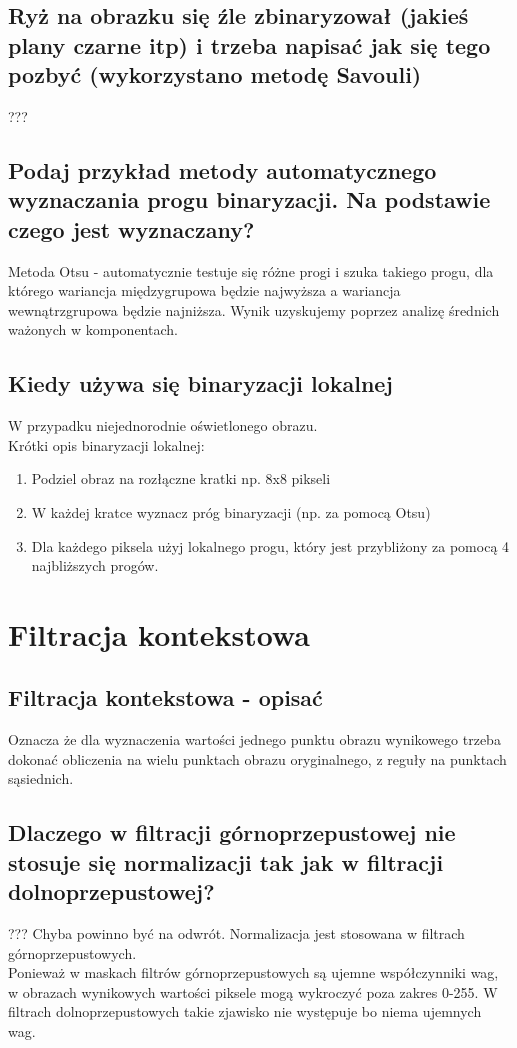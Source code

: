 \documentclass[a4paper, 12pt, titlepage]{article}
\begin{document}
\subsection{Ryż na obrazku się źle zbinaryzował (jakieś plany czarne itp) i trzeba napisać jak się tego pozbyć (wykorzystano metodę Savouli)}
???

\subsection{Podaj przykład metody automatycznego wyznaczania progu binaryzacji. Na podstawie czego jest wyznaczany?}
Metoda Otsu - automatycznie testuje się różne progi i szuka takiego progu, dla którego wariancja międzygrupowa będzie najwyższa a wariancja wewnątrzgrupowa będzie najniższa. Wynik uzyskujemy poprzez analizę średnich ważonych w komponentach.

\subsection{Kiedy używa się binaryzacji lokalnej}
W przypadku niejednorodnie oświetlonego obrazu.\\
Krótki opis binaryzacji lokalnej:
\begin{enumerate}[noitemsep]
	\item Podziel obraz na rozłączne kratki np. 8x8 pikseli
	\item W każdej kratce wyznacz próg binaryzacji (np. za pomocą Otsu)
	\item Dla każdego piksela użyj lokalnego progu, który jest przybliżony za pomocą 4 najbliższych progów.
\end{enumerate}
\pagebreak\section{Filtracja kontekstowa}

\subsection{Filtracja kontekstowa - opisać}
Oznacza że dla wyznaczenia wartości jednego punktu obrazu wynikowego trzeba dokonać obliczenia na wielu punktach obrazu oryginalnego, z reguły na punktach sąsiednich.

\subsection{Dlaczego w filtracji górnoprzepustowej nie stosuje się normalizacji tak jak w filtracji dolnoprzepustowej?}
??? Chyba powinno być na odwrót. Normalizacja jest stosowana w filtrach górnoprzepustowych. \\
Ponieważ w maskach filtrów górnoprzepustowych są ujemne współczynniki wag, w obrazach wynikowych wartości piksele mogą wykroczyć poza zakres 0-255. W filtrach dolnoprzepustowych takie zjawisko nie występuje bo niema ujemnych wag.
\end{document}
